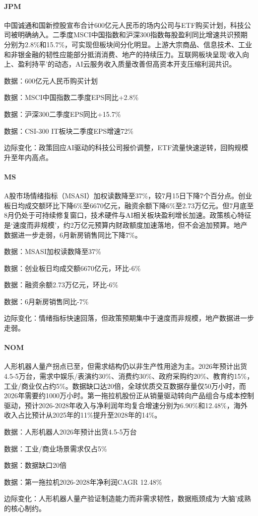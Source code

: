 \documentclass[11pt]{ctexart}
\begin{document}
\paragraph{JPM} 中国诚通和国新控股宣布合计600亿元人民币的场内公司与ETF购买计划，科技公司被明确纳入。二季度MSCI中国指数和沪深300指数每股盈利同比增速共识预期分别为2.8\%和15.7\%，可实现但板块间分化明显。上游大宗商品、信息技术、工业和非银金融的韧性应能部分抵消消费、地产的持续压力。互联网板块呈现‘收入向上、盈利持平’的动态，AI云服务收入质量改善但高资本开支压缩利润共识。
{\small\color{refgray}数据：600亿元人民币购买计划\par}
{\small\color{refgray}数据：MSCI中国指数二季度EPS同比+2.8\%\par}
{\small\color{refgray}数据：沪深300二季度EPS同比+15.7\%\par}
{\small\color{refgray}数据：CSI-300 IT板块二季度EPS增速72\%\par}
{\small\color{refgray}边际变化：政策回应AI驱动的科技公司报价调整，ETF流量快速逆转，回购规模升至年内高点。\par}
\paragraph{MS} A股市场情绪指标（MSASI）加权读数降至37\%，较7月15日下降7个百分点。创业板日均成交额环比下降6\%至6670亿元，融资余额下降6\%至2.73万亿元。但7月底至8月仍处于可持续修复窗口，技术硬件与AI相关板块盈利增长加速。政策核心特征是‘速度而非规模’，约2万亿元预算内财政额度加速落地，但不会追加预算。地产数据进一步走弱，6月新房销售同比下降7\%。
{\small\color{refgray}数据：MSASI加权读数降至37\%\par}
{\small\color{refgray}数据：创业板日均成交额6670亿元，环比-6\%\par}
{\small\color{refgray}数据：融资余额2.73万亿元，环比-6\%\par}
{\small\color{refgray}数据：6月新房销售同比-7\%\par}
{\small\color{refgray}边际变化：情绪指标快速回落，但政策预期集中于速度而非规模，地产数据进一步走弱。\par}
\paragraph{NOM} 人形机器人量产拐点已至，但需求结构仍以非生产性用途为主。2026年预计出货4.5-5万台，需求中娱乐/表演约30\%、消费约30\%、政府采购约20\%、教育约15\%，工业/商业仅占约5\%。数据缺口达20倍，全球优质交互数据存量仅50万小时，而2026年需要约1000万小时。第一拖拉机股份正从销量驱动转向产品组合与成本控制驱动，预计2026-2028年收入与净利润年均复合增速分别为6.90\%和12.48\%，海外收入占比预计从2025年的11\%提升至2028年的14\%。
{\small\color{refgray}数据：人形机器人2026年预计出货4.5-5万台\par}
{\small\color{refgray}数据：工业/商业场景需求仅占5\%\par}
{\small\color{refgray}数据：数据缺口20倍\par}
{\small\color{refgray}数据：第一拖拉机2026-2028年净利润CAGR 12.48\%\par}
{\small\color{refgray}边际变化：人形机器人量产验证制造能力而非需求韧性，数据瓶颈成为‘大脑’成熟的核心制约。\par}
\end{document}
